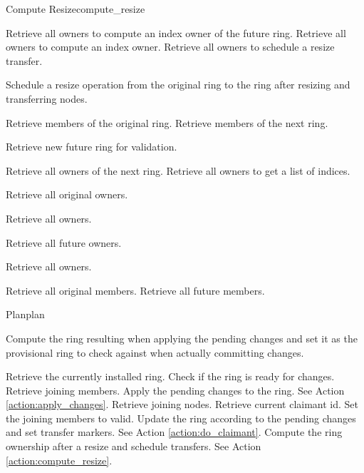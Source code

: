\begin{actionbox}{Compute Resize}{compute_resize}
\begin{action}
\begin{action}
			\begin{action}
				 Retrieve all owners to compute an index owner of the future ring.
				 Retrieve all owners to compute an index owner.
				 Retrieve all owners to schedule a resize transfer.
			\end{action}
			 Schedule a resize operation from the original ring to the ring after resizing and transferring nodes.
			\begin{action}
				 Retrieve members of the original ring.
				 Retrieve members of the next ring.
			\end{action}
			 Retrieve new future ring for validation.
			\begin{action}
				 Retrieve all owners of the next ring.
				 Retrieve all owners to get a list of indices.
			\end{action}
			 Retrieve all original owners.
			\begin{action}
				 Retrieve all owners.
			\end{action}
			 Retrieve all future owners.
			\begin{action}
				 Retrieve all owners.
			\end{action}
			 Retrieve all original members.
			 Retrieve all future members.
		\end{action}
	\end{action}
\end{actionbox}

\begin{actionbox}{Plan}{plan}
	\begin{action}
		 Compute the ring resulting when applying the pending changes and set it as the provisional ring to check against when actually committing changes.
		\begin{action}
			 Retrieve the currently installed ring.
			 Check if the ring is ready for changes.
			 Retrieve joining members.
			 Apply the pending changes to the ring. See Action \ref{action:apply_changes}.
			 Retrieve joining nodes.
			 Retrieve current claimant id.
			 Set the joining members to valid.
			 Update the ring according to the pending changes and set transfer markers. See Action \ref{action:do_claimant}.
			 Compute the ring ownership after a resize and schedule transfers. See Action \ref{action:compute_resize}.
		\end{action}
	\end{action}
\end{actionbox}

